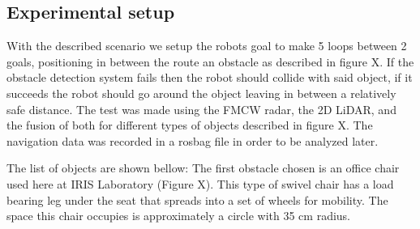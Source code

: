 \subsection{Experimental setup}
With the described scenario we setup the robots goal to make 5 loops between 2 goals, positioning in between the route an obstacle as described in  figure X. If the obstacle detection system fails then the robot should collide with said object, if it succeeds the robot should go around the object leaving in between a relatively safe distance. The test was made using the \ac{FMCW} radar, the 2D \ac{LiDAR}, and the fusion of both for different types of objects described in figure X. The  navigation data was recorded in a rosbag file in order to be analyzed later.

The list of objects are shown bellow:
The first obstacle chosen is an office chair used here at \ac{IRIS} Laboratory (Figure X). This type of swivel chair has a load bearing leg under the seat  that  spreads into a set of wheels for mobility. The space this chair occupies is approximately a circle with 35 cm radius.
